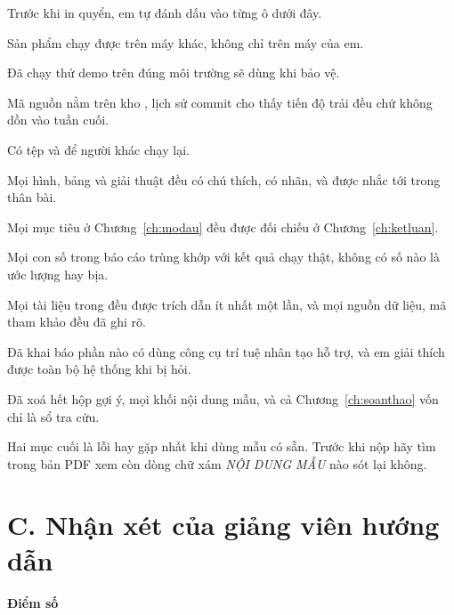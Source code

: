 Trước khi in quyển, em tự đánh dấu vào từng ô dưới đây.

\begin{tukiem}
  \item Sản phẩm chạy được trên máy khác, không chỉ trên máy của em.
  \item Đã chạy thử demo trên đúng môi trường sẽ dùng khi bảo vệ.
  \item Mã nguồn nằm trên kho , lịch sử commit cho thấy tiến độ
        trải đều chứ không dồn vào tuần cuối.
  \item Có tệp  và  để người khác chạy lại.
  \item Mọi hình, bảng và giải thuật đều có chú thích, có nhãn, và được nhắc
        tới trong thân bài.
  \item Mọi mục tiêu ở Chương~\ref{ch:modau} đều được đối chiếu ở
        Chương~\ref{ch:ketluan}.
  \item Mọi con số trong báo cáo trùng khớp với kết quả chạy thật, không có
        số nào là ước lượng hay bịa.
  \item Mọi tài liệu trong  đều được trích dẫn ít nhất một
        lần, và mọi nguồn dữ liệu, mã tham khảo đều đã ghi rõ.
  \item Đã khai báo phần nào có dùng công cụ trí tuệ nhân tạo hỗ trợ, và em
        giải thích được toàn bộ hệ thống khi bị hỏi.
  \item Đã xoá hết hộp gợi ý, mọi khối nội dung mẫu, và cả
        Chương~\ref{ch:soanthao} vốn chỉ là sổ tra cứu.
\end{tukiem}

\begin{luuy}
Hai mục cuối là lỗi hay gặp nhất khi dùng mẫu có sẵn. Trước khi nộp hãy tìm
trong bản PDF xem còn dòng chữ xám \emph{NỘI DUNG MẪU} nào sót lại không.
\end{luuy}

\section*{C. Nhận xét của giảng viên hướng dẫn}
{}

\khungnhanxet[7.5cm]

\vspace{0.8em}
\noindent\begin{minipage}[t]{0.5\textwidth}
\color{daunavy}
{\color{daumaroon}\bfseries Điểm số}

\vspace{0.7em}

\vspace{0.9em}
\end{minipage}\hfill
{}
